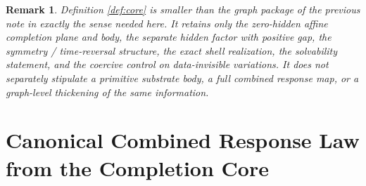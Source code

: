 \documentclass[11pt]{article}
\newtheorem{remark}{Remark}
\begin{document}
\begin{remark}
Definition \ref{def:core} is smaller than the graph package of the previous note in exactly the sense needed here. It retains only the zero-hidden affine completion plane and body, the separate hidden factor with positive gap, the symmetry / time-reversal structure, the exact shell realization, the solvability statement, and the coercive control on data-invisible variations. It does not separately stipulate a primitive substrate body, a full combined response map, or a graph-level thickening of the same information.
\end{remark}

\section{Canonical Combined Response Law from the Completion Core}
\end{document}

